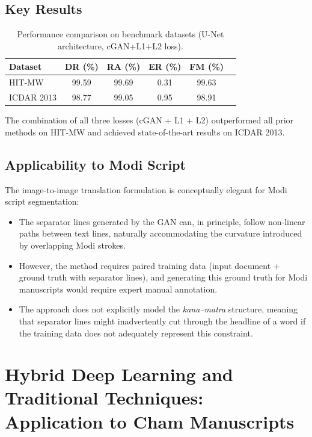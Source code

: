 \documentclass[11pt, a4paper]{article}
\begin{document}
\subsection{Key Results}

\begin{table}[H]
\centering
\caption{Performance comparison on benchmark datasets (U-Net architecture, cGAN+L1+L2 loss).}
\begin{tabular}{lccccc}
\toprule
\textbf{Dataset} & \textbf{DR (\%)} & \textbf{RA (\%)} & \textbf{ER (\%)} & \textbf{FM (\%)} \\
\midrule
HIT-MW       & 99.59 & 99.69 & 0.31 & 99.63 \\
ICDAR 2013   & 98.77 & 99.05 & 0.95 & 98.91 \\
\bottomrule
\end{tabular}
\label{tab:gan_results_kundu}
\end{table}

The combination of all three losses (cGAN + L1 + L2) outperformed all prior methods on HIT-MW and achieved state-of-the-art results on ICDAR 2013.

\subsection{Applicability to Modi Script}

The image-to-image translation formulation is conceptually elegant for Modi script segmentation:
\begin{itemize}[leftmargin=1.5em]
    \item The separator lines generated by the GAN can, in principle, follow non-linear paths between text lines, naturally accommodating the curvature introduced by overlapping Modi strokes.
    \item However, the method requires paired training data (input document + ground truth with separator lines), and generating this ground truth for Modi manuscripts would require expert manual annotation.
    \item The approach does not explicitly model the \textit{kana--matra} structure, meaning that separator lines might inadvertently cut through the headline of a word if the training data does not adequately represent this constraint.
\end{itemize}


\section{Hybrid Deep Learning and Traditional Techniques: Application to Cham Manuscripts}
\label{sec:cham}
\end{document}
